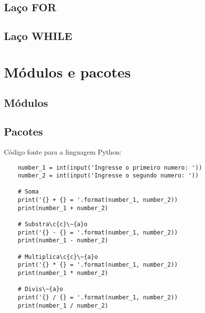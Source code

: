             \subsection{La\c{c}o FOR}

            \subsection{La\c{c}o WHILE}


    \section{M\'{o}dulos e pacotes}



            \subsection{M\'{o}dulos}



            \subsection{Pacotes}






    C\'{o}digo fonte para a linguagem Python:
    \begin{lstlisting}
    number_1 = int(input('Ingresse o primeiro numero: '))
    number_2 = int(input('Ingresse o segundo numero: '))

    # Soma
    print('{} + {} = '.format(number_1, number_2))
    print(number_1 + number_2)

    # Substra\c{c}\~{a}o
    print('{} - {} = '.format(number_1, number_2))
    print(number_1 - number_2)

    # Multiplica\c{c}\~{a}o
    print('{} * {} = '.format(number_1, number_2))
    print(number_1 * number_2)

    # Divis\~{a}o
    print('{} / {} = '.format(number_1, number_2))
    print(number_1 / number_2)
    \end{lstlisting}





